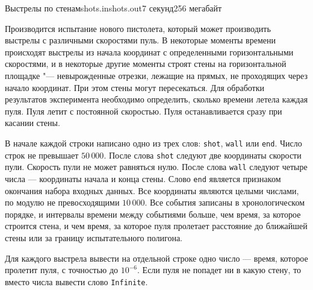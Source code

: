 
\begin{problem}{Выстрелы по стенам}{shots.in}{shots.out}{7 секунд}{256 мегабайт}

\hspace*{\parindent}Производится испытание нового пистолета, который
может производить выстрелы с различными скоростями пуль.
В некоторые моменты времени происходят выстрелы из
начала координат с определенными горизонтальными скоростями,
и в некоторые другие моменты строят стены на горизонтальной
площадке "--- невырожденные отрезки, лежащие на прямых,
не проходящих через начало координат. При этом стены могут пересекаться.
Для обработки результатов эксперимента необходимо определить,
сколько времени летела каждая пуля. Пуля летит
с постоянной скоростью. Пуля останавливается сразу 
при касании стены.

\InputFile

В начале каждой строки написано одно из трех слов:
\texttt{shot}, \texttt{wall} или \texttt{end}.
Число строк не превышает $50\,000$. После слова
\texttt{shot} следуют две координаты скорости
пули. Скорость пули не может равняться нулю.
После слова \texttt{wall} следуют четыре
числа --- координаты начала и конца стены.
Слово \texttt{end} является признаком окончания набора
входных данных. Все координаты являются целыми
числами, по модулю не превосходящими $10\,000$.
Все события записаны в хронологическом порядке,
и интервалы времени между событиями больше, чем
время, за которое строится стена, и чем время, за которое
пуля пролетает расстояние до ближайшей стены или за
границу испытательного полигона.

\OutputFile

Для каждого выстрела вывести на отдельной строке
одно число --- время, которое пролетит пуля,
с точностью до $10^{-6}$. Если пуля не попадет
ни в какую стену, то вместо числа вывести
слово \texttt{Infinite}.

\Example

\begin{example}
\exmp{
{\fontsize{10pt}{11pt}\selectfont{
shot 1 0
wall 1 0 0 1
shot 1 1
shot -1 3
wall 1 0 -1 2
shot -1 3
wall 1 1 -1 1
shot -1 3
wall 2 3 2 -3
wall 3 -2 -3 -2
shot 1 -1
shot 40 -39
shot 9999 -10000
shot -1 -1
shot -3000 -2000
shot -3001 -2000
shot -3000 -2001
shot 1 0
shot 1 1
wall -1 2 10 -10
shot -1 1
shot 0 1
shot 1 1
shot 1 0
shot 1 -1
wall 0 -10000 -10000 0
shot -2 -1
end
}}
}{
{\fontsize{10pt}{11pt}\selectfont{
Infinite
0.50000000000000000000
Infinite
0.50000000000000000000
0.33333333333333333333
2.00000000000000000000
0.05000000000000000000
0.00020000000000000000
2.00000000000000000000
0.00100000000000000000
Infinite
0.00099950024987506247
1.00000000000000000000
0.50000000000000000000
1.00000000000000000000
0.90909090909090909091
0.43478260869565217391
0.83333333333333333333
2.00000000000000000000
3333.33333333333333333
}}
}%
\end{example}
\end{problem}

